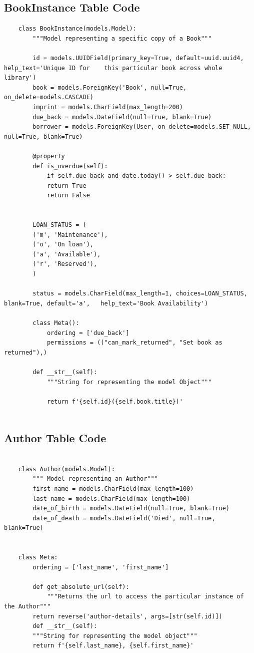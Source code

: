 \documentclass[12pt, a4paper]{report}
\begin{document}
\subsection{BookInstance Table Code}
\begin{lstlisting}
	class BookInstance(models.Model):
		"""Model representing a specific copy of a Book"""
	
		id = models.UUIDField(primary_key=True, default=uuid.uuid4, help_text='Unique ID for 	this particular book across whole library')
		book = models.ForeignKey('Book', null=True, on_delete=models.CASCADE)
		imprint = models.CharField(max_length=200)
		due_back = models.DateField(null=True, blank=True)
		borrower = models.ForeignKey(User, on_delete=models.SET_NULL, null=True, blank=True)
	
		@property
		def is_overdue(self):
			if self.due_back and date.today() > self.due_back:
			return True
			return False
	
	
		LOAN_STATUS = (
		('m', 'Maintenance'),
		('o', 'On loan'),
		('a', 'Available'),
		('r', 'Reserved'),
		)
	
		status = models.CharField(max_length=1, choices=LOAN_STATUS, blank=True, default='a', 	help_text='Book Availability')
	
		class Meta():
			ordering = ['due_back']
			permissions = (("can_mark_returned", "Set book as returned"),)
	
		def __str__(self):
			"""String for representing the model Object"""
	
			return f'{self.id}({self.book.title})'
	
\end{lstlisting}

\subsection{Author Table Code}
\begin{lstlisting}
	
	class Author(models.Model):
		""" Model representing an Author"""
		first_name = models.CharField(max_length=100)
		last_name = models.CharField(max_length=100)
		date_of_birth = models.DateField(null=True, blank=True)
		date_of_death = models.DateField('Died', null=True, blank=True)
	
	
	class Meta:
		ordering = ['last_name', 'first_name']
	
		def get_absolute_url(self):
			"""Returns the url to access the particular instance of the Author"""
		return reverse('author-details', args=[str(self.id)])
		def __str__(self):
		"""String for representing the model object"""
		return f'{self.last_name}, {self.first_name}'
	
\end{lstlisting}
\end{document}

